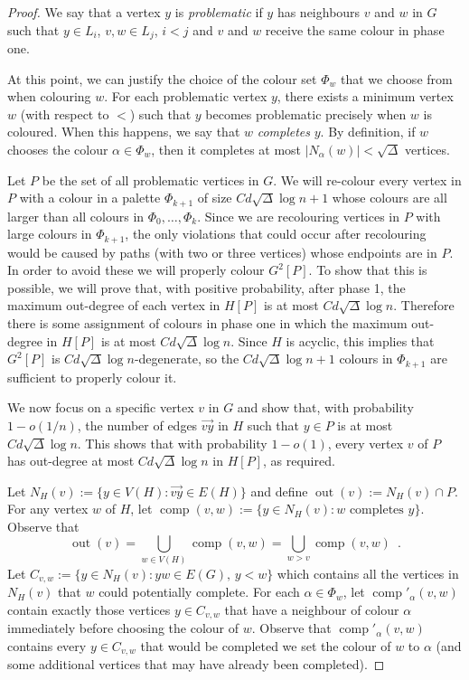 \documentclass[kpfonts]{patmorin}
\newcommand{\defin}[1]{\emph{\color{brightmaroon}#1}}
\DeclareMathOperator{\outn}{out}
\DeclareMathOperator{\comp}{comp}
\begin{document}
\begin{proof}
  We say that a vertex $y$ is \defin{problematic} if $y$ has neighbours $v$ and $w$ in $G$ such that $y\in L_i$, $v,w\in L_j$, $i < j$ and $v$ and $w$ receive the same colour in phase one.

  At this point, we can justify the choice of the colour set $\Phi_w$ that we choose from when colouring $w$. For each problematic vertex $y$, there exists a minimum vertex $w$ (with respect to $<$) such that $y$ becomes problematic precisely when $w$ is coloured.  When this happens, we say that $w$ \defin{completes} $y$. By definition, if $w$ chooses the colour $\alpha\in\Phi_w$, then it completes at most $|N_{\alpha}(w)|<\sqrt{\Delta}$ vertices.

  Let $P$ be the set of all problematic vertices in $G$.  We will re-colour every vertex in $P$ with a colour in a palette $\Phi_{k+1}$ of size $Cd\sqrt{\Delta}\log n+1$ whose colours are all larger than all colours in $\Phi_0,\ldots,\Phi_k$.
  Since we are recolouring vertices in $P$ with large colours in $\Phi_{k+1}$, the only violations that could occur after recolouring would be caused by paths (with two or three vertices) whose endpoints are in $P$.  In order to avoid these we will properly colour $G^2[P]$.  To show that this is possible, we will prove that, with positive probability, after phase 1, the maximum out-degree of each vertex in $H[P]$ is at most $Cd\sqrt{\Delta}\log n$.  Therefore there is some assignment of colours in phase one in which the maximum out-degree in $H[P]$ is at most $Cd\sqrt{\Delta}\log n$.  Since $H$ is acyclic, this implies that $G^2[P]$ is $Cd\sqrt{\Delta}\log n$-degenerate, so the $Cd\sqrt{\Delta}\log n+1$ colours in $\Phi_{k+1}$ are sufficient to properly colour it.

  We now focus on a specific vertex $v$ in $G$ and show that, with probability $1-o(1/n)$, the number of edges $\overrightarrow{vy}$ in $H$ such that $y\in P$ is at most $Cd\sqrt{\Delta}\log n$.  This shows that with probability $1-o(1)$, every vertex $v$ of $P$ has out-degree at most $Cd\sqrt{\Delta}\log n$ in $H[P]$, as required.

  Let $N_H(v):=\{y\in V(H): \overrightarrow{vy}\in E(H)\}$ and define $\outn(v):=N_H(v)\cap P$. For any vertex $w$ of $H$, let $\comp(v,w):=\{y\in N_H(v):\text{$w$ completes $y$}\}$.  Observe that
  \[
    \outn(v) = \bigcup_{w\in V(H)} \comp(v,w) = \bigcup_{w>v} \comp(v,w) \enspace .
  \]
  Let $C_{v,w}:=\{y\in N_H(v): yw\in E(G),\, y < w\}$ which contains all the vertices in $N_H(v)$ that $w$ could potentially complete.  For each $\alpha\in\Phi_w$, let $\comp'_\alpha(v,w)$ contain exactly those vertices $y\in C_{v,w}$ that have a neighbour of colour $\alpha$ immediately before choosing the colour of $w$.  Observe that $\comp'_\alpha(v,w)$ contains every $y\in C_{v,w}$ that would be completed we set the colour of $w$ to $\alpha$ (and some additional vertices that may have already been completed).



\end{proof}
\end{document}
